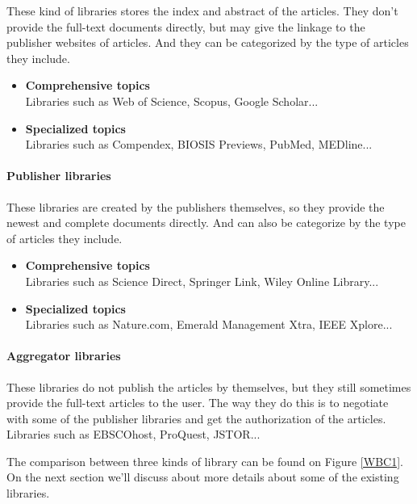 	These kind of libraries stores the index and abstract of the articles.
	They don't provide the full-text documents directly, but may give the linkage to the publisher websites of articles.
	And they can be categorized by the type of articles they include.
	
	\begin{itemize}
		
		\item\textbf{Comprehensive topics}\\Libraries such as Web of Science, Scopus, Google Scholar...
		\item\textbf{Specialized topics}\\Libraries such as Compendex, BIOSIS Previews, PubMed, MEDline...
		
	\end{itemize}
	
\paragraph{Publisher libraries}

	These libraries are created by the publishers themselves, so they provide the newest and complete documents directly.
	And can also be categorize by the type of articles they include.
	
	\begin{itemize}
		
		\item\textbf{Comprehensive topics}\\Libraries such as Science Direct, Springer Link, Wiley Online Library...
		\item\textbf{Specialized topics}\\Libraries such as Nature.com, Emerald Management Xtra, IEEE Xplore...
		
	\end{itemize}
	
\paragraph{Aggregator libraries}

	These libraries do not publish the articles by themselves, but they still sometimes provide the full-text articles to the user.
	The way they do this is to negotiate with some of the publisher libraries and get the authorization of the articles.
	Libraries such as EBSCOhost, ProQuest, JSTOR...

The comparison between three kinds of library can be found on Figure \ref{WBC1}.
On the next section we'll discuss about more details about some of the existing libraries.

